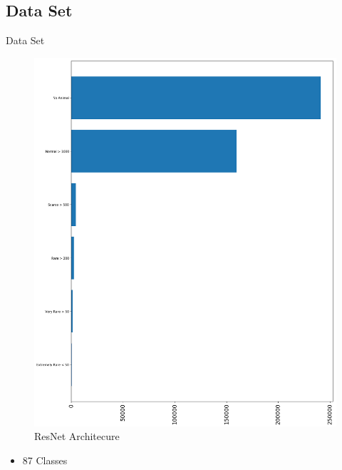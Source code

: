 \documentclass[10pt]{beamer}
\begin{document}
\subsection{Data Set}
\begin{frame}{Data Set}
	\begin{minipage}[c]{0.48\linewidth}
		\centering
		\begin{figure}
			\includegraphics[width=\linewidth,height=.8\textheight,keepaspectratio]{images/Data_dist_sorted_reduced_v2.png}
			\caption{ResNet Architecure}
		\end{figure}
	\end{minipage}
	\hfill
	\begin{minipage}[c]{0.48\linewidth}
	\begin{itemize}
		\item 87 Classes
	\end{itemize}

	\end{minipage}
\end{frame}
\end{document}
